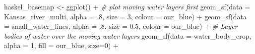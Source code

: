 \documentclass[
  paper=a4,
  ,captions=tableheading
]{scrartcl}
\newenvironment{Shaded}{\begin{snugshade}}{\end{snugshade}}
\newcommand{\AttributeTok}[1]{\textcolor[rgb]{0.77,0.63,0.00}{#1}}
\newcommand{\CommentTok}[1]{\textcolor[rgb]{0.56,0.35,0.01}{\textit{#1}}}
\newcommand{\DecValTok}[1]{\textcolor[rgb]{0.00,0.00,0.81}{#1}}
\newcommand{\FloatTok}[1]{\textcolor[rgb]{0.00,0.00,0.81}{#1}}
\newcommand{\FunctionTok}[1]{\textcolor[rgb]{0.00,0.00,0.00}{#1}}
\newcommand{\NormalTok}[1]{#1}
\newcommand{\OtherTok}[1]{\textcolor[rgb]{0.56,0.35,0.01}{#1}}
\newcommand{\SpecialCharTok}[1]{\textcolor[rgb]{0.00,0.00,0.00}{#1}}
\begin{document}
\begin{Shaded}
\begin{Highlighting}[]
\NormalTok{haskel\_basemap }\OtherTok{\textless{}{-}} \FunctionTok{ggplot}\NormalTok{() }\SpecialCharTok{+}
  \CommentTok{\# plot moving water layers first}
  \FunctionTok{geom\_sf}\NormalTok{(}\AttributeTok{data =}\NormalTok{ Kansas\_river\_multi, }\AttributeTok{alpha =}\NormalTok{ .}\DecValTok{8}\NormalTok{,}
          \AttributeTok{size =} \DecValTok{3}\NormalTok{, }\AttributeTok{colour =}\NormalTok{ our\_blue) }\SpecialCharTok{+}
  \FunctionTok{geom\_sf}\NormalTok{(}\AttributeTok{data =}\NormalTok{ small\_water\_lines, }\AttributeTok{alpha =}\NormalTok{ .}\DecValTok{8}\NormalTok{,}
          \AttributeTok{size =} \FloatTok{0.5}\NormalTok{, }\AttributeTok{colour =}\NormalTok{ our\_blue) }\SpecialCharTok{+}
  \CommentTok{\# Layer bodies of water over the moving water layers}
  \FunctionTok{geom\_sf}\NormalTok{(}\AttributeTok{data =}\NormalTok{ water\_body\_crop, }\AttributeTok{alpha =} \DecValTok{1}\NormalTok{, }\AttributeTok{fill =}\NormalTok{ our\_blue, }\AttributeTok{size=}\DecValTok{0}\NormalTok{) }\SpecialCharTok{+}
  

\end{Highlighting}
\end{Shaded}
\end{document}

